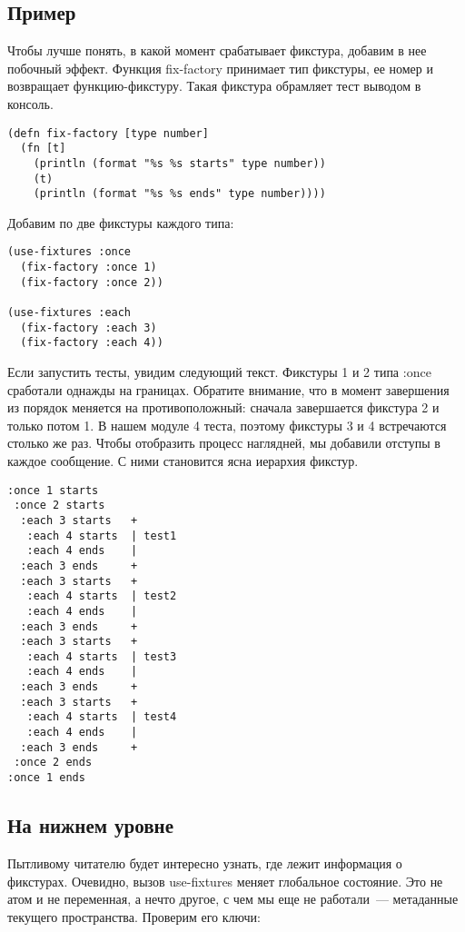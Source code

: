 \subsection{Пример}

Чтобы лучше понять, в какой момент срабатывает фикстура, добавим в нее побочный
эффект. Функция fix-factory принимает тип фикстуры, ее номер и возвращает
функцию-фикстуру. Такая фикстура обрамляет тест выводом в консоль.

\begin{verbatim}
(defn fix-factory [type number]
  (fn [t]
    (println (format "%s %s starts" type number))
    (t)
    (println (format "%s %s ends" type number))))
\end{verbatim}

Добавим по две фикстуры каждого типа:

\begin{verbatim}
(use-fixtures :once
  (fix-factory :once 1)
  (fix-factory :once 2))

(use-fixtures :each
  (fix-factory :each 3)
  (fix-factory :each 4))
\end{verbatim}

Если запустить тесты, увидим следующий текст. Фикстуры 1 и 2 типа :once
сработали однажды на границах. Обратите внимание, что в момент завершения из
порядок меняется на противоположный: сначала завершается фикстура 2 и только
потом 1. В нашем модуле 4 теста, поэтому фикстуры 3 и 4 встречаются столько же
раз. Чтобы отобразить процесс наглядней, мы добавили отступы в каждое
сообщение. С ними становится ясна иерархия фикстур.

\begin{verbatim}
:once 1 starts
 :once 2 starts
  :each 3 starts   +
   :each 4 starts  | test1
   :each 4 ends    |
  :each 3 ends     +
  :each 3 starts   +
   :each 4 starts  | test2
   :each 4 ends    |
  :each 3 ends     +
  :each 3 starts   +
   :each 4 starts  | test3
   :each 4 ends    |
  :each 3 ends     +
  :each 3 starts   +
   :each 4 starts  | test4
   :each 4 ends    |
  :each 3 ends     +
 :once 2 ends
:once 1 ends
\end{verbatim}

\subsection{На нижнем уровне}

Пытливому читателю будет интересно узнать, где лежит информация о
фикстурах. Очевидно, вызов use-fixtures меняет глобальное состояние. Это не атом
и не переменная, а нечто другое, с чем мы еще не работали~--- метаданные текущего
пространства. Проверим его ключи:


